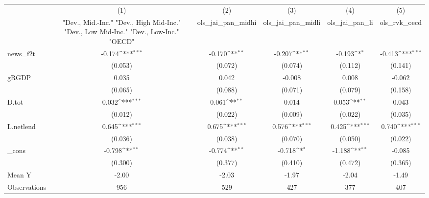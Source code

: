 {
\def\sym#1{\ifmmode^{#1}\else\(^{#1}\)\fi}
\begin{tabular}{l*{5}{c}}
\toprule
            &\multicolumn{1}{c}{(1)}&\multicolumn{1}{c}{(2)}&\multicolumn{1}{c}{(3)}&\multicolumn{1}{c}{(4)}&\multicolumn{1}{c}{(5)}\\
            &\multicolumn{1}{c}{ "Dev., Mid.-Inc." "Dev., High Mid-Inc." "Dev., Low Mid-Inc." "Dev., Low-Inc." "OECD" }&\multicolumn{1}{c}{ols\_jai\_pan\_midhi}&\multicolumn{1}{c}{ols\_jai\_pan\_midli}&\multicolumn{1}{c}{ols\_jai\_pan\_li}&\multicolumn{1}{c}{ols\_rvk\_oecd}\\
\midrule
news\_f2t    &      -0.174\sym{***}&      -0.170\sym{**} &      -0.207\sym{**} &      -0.193\sym{*}  &      -0.413\sym{***}\\
            &     (0.053)         &     (0.072)         &     (0.074)         &     (0.112)         &     (0.141)         \\
\addlinespace
gRGDP       &       0.035         &       0.042         &      -0.008         &       0.008         &      -0.062         \\
            &     (0.065)         &     (0.088)         &     (0.071)         &     (0.079)         &     (0.158)         \\
\addlinespace
D.tot       &       0.032\sym{***}&       0.061\sym{**} &       0.014         &       0.053\sym{**} &       0.043         \\
            &     (0.012)         &     (0.022)         &     (0.009)         &     (0.022)         &     (0.035)         \\
\addlinespace
L.netlend   &       0.645\sym{***}&       0.675\sym{***}&       0.576\sym{***}&       0.425\sym{***}&       0.740\sym{***}\\
            &     (0.036)         &     (0.038)         &     (0.070)         &     (0.050)         &     (0.022)         \\
\addlinespace
\_cons      &      -0.798\sym{**} &      -0.774\sym{**} &      -0.718\sym{*}  &      -1.188\sym{**} &      -0.085         \\
            &     (0.300)         &     (0.377)         &     (0.410)         &     (0.472)         &     (0.365)         \\
\midrule
Mean Y      &       -2.00         &       -2.03         &       -1.97         &       -2.04         &       -1.49         \\
Observations&         956         &         529         &         427         &         377         &         407         \\
\bottomrule
\end{tabular}
}
